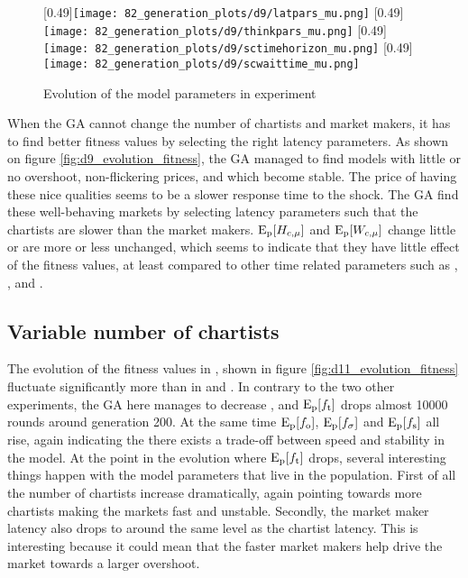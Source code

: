 \begin{figure}
	\centering
	[0.49\linewidth]{\texttt{[image: 82\_generation\_plots/d9/latpars\_mu.png]}}
	[0.49\linewidth]{\texttt{[image: 82\_generation\_plots/d9/thinkpars\_mu.png]}}
	\vspace{0.5cm}
	[0.49\linewidth]{\texttt{[image: 82\_generation\_plots/d9/sctimehorizon\_mu.png]}}
	[0.49\linewidth]{\texttt{[image: 82\_generation\_plots/d9/scwaittime\_mu.png]}}
	\caption{Evolution of the model parameters in experiment \dten}
	\label{fig:d9_evolution_parameters}
\end{figure}

When the GA cannot change the number of chartists and market makers, it has to find better fitness values by selecting the right latency parameters. As shown on figure \ref{fig:d9_evolution_fitness}, the GA managed to find models with little or no overshoot, non-flickering prices, and which become stable. The price of having these nice qualities seems to be a slower response time to the shock. The GA find these well-behaving markets by selecting latency parameters such that the chartists are slower than the market makers. $\mathrm{E}_\text{p}[H_{c, \mu}]$ and $\mathrm{E}_\text{p}[W_{c, \mu}]$ change little or are more or less unchanged, which seems to indicate that they have little effect of the fitness values, at least compared to other time related parameters such as \sclatencymu, \ssmmlatencymu, \scthinkmu{} and \ssmmthinkmu. 


\subsection{Variable number of chartists}
The evolution of the fitness values in \deleven, shown in figure \ref{fig:d11_evolution_fitness} fluctuate significantly more than in \dnine{} and \dten. In contrary to the two other experiments, the GA here manages to decrease \timetoreachnewfundamental, and $\mathrm{E}_\text{p}[f_\text{t}]$ drops almost 10000 rounds around generation 200. At the same time $\mathrm{E}_\text{p}[f_\text{o}]$, $\mathrm{E}_\text{p}[f_\sigma]$ and $\mathrm{E}_\text{p}[f_\text{s}]$ all rise, again indicating the there exists a trade-off between speed and stability in the model. At the point in the evolution where $\mathrm{E}_\text{p}[f_\text{t}]$ drops, several interesting things happen with the model parameters that live in the population. First of all the number of chartists increase dramatically, again pointing towards more chartists making the markets fast and unstable. Secondly, the market maker latency also drops to around the same level as the chartist latency. This is interesting because it could mean that the faster market makers help drive the market towards a larger overshoot.

